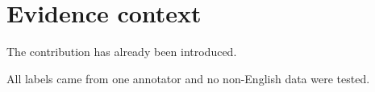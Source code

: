 \section{Evidence context}
The contribution has already been introduced.

All labels came from one annotator and no non-English data were tested.
